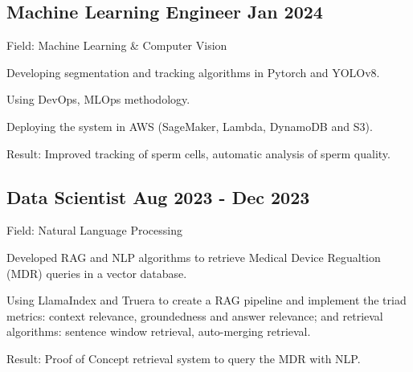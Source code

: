 \documentclass[a4paper,12pt]{article}
\begin{document}


\subsection{Machine Learning Engineer \hfill Jan 2024}
\vspace*{1pt}
Field: Machine Learning \& Computer Vision \\
\vspace*{\spaceAfterField}
\begin{zitemize}
\item Developing segmentation and tracking algorithms in Pytorch and YOLOv8. 
\item Using DevOps, MLOps methodology.
\item Deploying the system in AWS (SageMaker, Lambda, DynamoDB and S3).
\item Result: Improved tracking of sperm cells, automatic analysis of sperm quality.
\end{zitemize}
\vspace*{5pt}


\subsection{Data Scientist \hfill Aug 2023 - Dec 2023}
\vspace*{1pt}
Field: Natural Language Processing \\
\vspace*{\spaceAfterField}
\begin{zitemize}
\item Developed RAG and NLP algorithms to retrieve Medical Device Regualtion (MDR) queries in a vector database.
\item Using LlamaIndex and Truera to create a RAG pipeline and implement the triad metrics: context relevance, groundedness and answer relevance; and retrieval algorithms: sentence window retrieval, auto-merging retrieval.
\item Result: Proof of Concept retrieval system to query the MDR with NLP.
\end{zitemize}
\vspace*{5pt}
\end{document}
